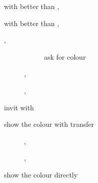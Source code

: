 \documentclass[../polish_club.tex]{subfiles}
\begin{document}

\begin{description}
  \item[] \PassOrCorrect{} with better \SpadeSymbol{} than \HeartSymbol, 
        \begin{description}
          \item[\PassBid] 
          \item[] 
        \end{description}
  \item[] \PassOrCorrect{} with better \HeartSymbol{} than \SpadeSymbol, 
        \begin{description}
          \item[\PassBid] 
          \item[] 
        \end{description}
  \item[] \Relay, 
        \begin{description}
          \item[] 
                \begin{description}
                  \item[] ask for colour
                        \begin{description}
                          \item[] 
                          \item[] 
                        \end{description}
                \end{description}
          \item[] , 
          \item[] , 
        \end{description}
  \item[]
  \item[] invit with 
  \item[] show the colour with transfer
        \begin{description}
          \item[] \Transfer{\HeartSymbol}, 
          \item[] \Transfer{\SpadeSymbol}, 
        \end{description}
  \item[] show the colour directly
        \begin{description}
          \item[] 
          \item[] 
        \end{description}
\end{description}
\end{document}
